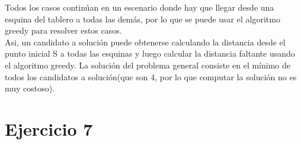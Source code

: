 \documentclass[12pt, titlepage, a4paper]{article}
\begin{document}
Todos los casos continúan en un escenario donde hay que llegar desde una esquina
del tablero a todas las demás, por lo que se puede usar el algoritmo greedy 
para resolver estos casos.\\

Asi, un candidato a solución puede obtenerse calculando la distancia desde el punto
inicial S a todas las esquinas y luego calcular la distancia faltante usando
el algoritmo greedy. La solución del problema general consiste en el mínimo de
todos los candidatos a solución(que son 4, por lo que computar la solución no
es muy costoso).

\section{Ejercicio 7}
\end{document}
